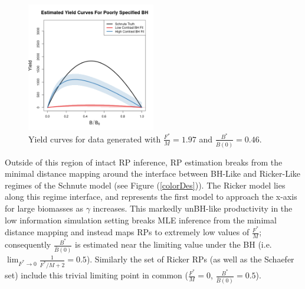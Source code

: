 %
\begin{figure}
\vspace{-0.75cm}
\includegraphics[width=0.5\textwidth]{../gpBias/yeildRelCurveCompareHHardFlatT30N150WWideN112PrettyX1.9707Z0.4633.png}
\vspace{-1cm}
\caption{
Yield curves for data generated with $\frac{F^*}{M}=1.97$ and $\frac{B^*}{\bar B(0)}=0.46$. %
}
\label{bhFmsy}
\end{figure}

%
Outside of this region of intact RP inference, RP estimation breaks from the minimal 
distance mapping around the interface between BH-Like and Ricker-Like regimes 
of the Schnute model (see Figure (\ref{colorDes})). The Ricker model lies 
along this regime interface, and represents the first model to approach the 
x-axis for large biomasses as $\gamma$ increases. This markedly unBH-like 
productivity in the low information simulation setting breaks MLE inference 
from the minimal distance mapping and instead maps RPs to extremely low values 
of $\frac{F^*}{M}$; consequently $\frac{B^*}{\bar B(0)}$ is estimated near the 
limiting value under the BH (i.e. $\lim_{F^* \to 0}\frac{1}{F^*/M+2}=0.5$).
Similarly the set of Ricker RPs (as well as the Schaefer set) include this
trivial limiting point in common ($\frac{F^*}{M}=0$, $\frac{B^*}{\bar B(0)}=0.5$). 

